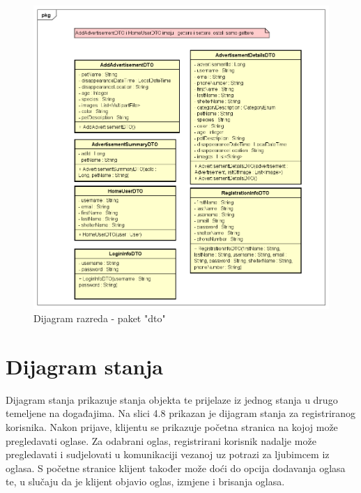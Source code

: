			\begin{figure}[htb]
				\centering
				\includegraphics[width=\textwidth]{slike/dr4_dto.png}
				\caption{Dijagram razreda - paket "dto"}
			\end{figure}
			\pagebreak
			
		\section{Dijagram stanja}
			
			
			\noindent Dijagram stanja prikazuje stanja objekta te prijelaze iz jednog stanja u drugo temeljene na događajima. Na slici 4.8 prikazan je dijagram stanja za registriranog korisnika. Nakon prijave, klijentu se prikazuje početna stranica na kojoj može pregledavati oglase. Za odabrani oglas, registrirani korisnik nadalje može pregledavati i sudjelovati u komunikaciji vezanoj uz potrazi za ljubimcem iz oglasa. S početne stranice klijent također može doći do opcija dodavanja oglasa te, u slučaju da je klijent objavio oglas, izmjene i brisanja oglasa.
			
